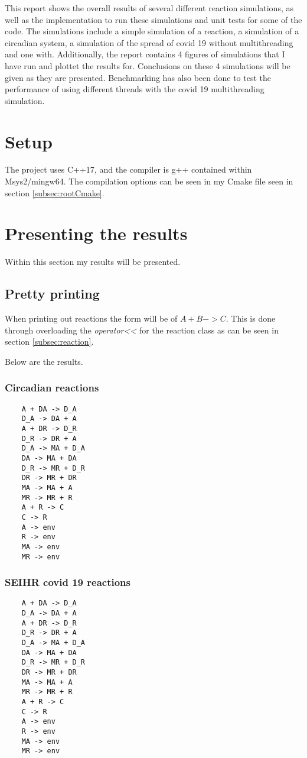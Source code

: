 This report shows the overall results of several different reaction simulations, as well as the implementation to run these simulations and unit tests for some of the code. 
The simulations include a simple simulation of a reaction, a simulation of a circadian system, a simulation of the spread of covid 19 without multithreading and one with.
Additionally, the report contains 4 figures of simulations that I have run and plottet the results for.
Conclusions on these 4 simulations will be given as they are presented.
Benchmarking has also been done to test the performance of using different threads with the covid 19 multithreading simulation.

\section{Setup}
The project uses C++17, and the compiler is g++ contained within Msys2/mingw64.
The compilation options can be seen in my Cmake file seen in section \ref{subsec:rootCmake}.


\section{Presenting the results}
Within this section my results will be presented.
\subsection{Pretty printing}
When printing out reactions the form will be of $A + B -> C$. This is done through overloading the \textit{operator<<} for the reaction class as can be seen in section \ref{subsec:reaction}.

Below are the results.

\subsubsection{Circadian reactions}
\begin{verbatim}
    A + DA -> D_A
    D_A -> DA + A
    A + DR -> D_R
    D_R -> DR + A
    D_A -> MA + D_A
    DA -> MA + DA
    D_R -> MR + D_R
    DR -> MR + DR
    MA -> MA + A
    MR -> MR + R
    A + R -> C
    C -> R
    A -> env
    R -> env
    MA -> env
    MR -> env
\end{verbatim}

\subsubsection{SEIHR covid 19 reactions}
\begin{verbatim}
    A + DA -> D_A
    D_A -> DA + A
    A + DR -> D_R
    D_R -> DR + A
    D_A -> MA + D_A
    DA -> MA + DA
    D_R -> MR + D_R
    DR -> MR + DR
    MA -> MA + A
    MR -> MR + R
    A + R -> C
    C -> R
    A -> env
    R -> env
    MA -> env
    MR -> env
\end{verbatim}

